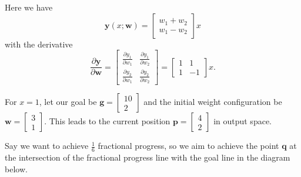 \documentclass{article}
\let\vec\mathbf
\begin{document}
Here we have
\begin{equation*}
    \vec{y}(x; \vec{w}) = 
    \begin{bmatrix}
        w_1 + w_2 \\
        w_1 - w_2
    \end{bmatrix}
    x
\end{equation*}
with the derivative
\begin{equation*}
    \frac{\partial \vec{y}}{\partial \vec{w}}
    =
    \begin{bmatrix}
        \frac{\partial y_1}{\partial w_1} & \frac{\partial y_1}{\partial w_2} \\
        \frac{\partial y_2}{\partial w_1} & \frac{\partial y_2}{\partial w_2}
    \end{bmatrix}
    =
    \begin{bmatrix}
        1 & 1 \\
        1 & -1
    \end{bmatrix}
    x.
\end{equation*}

For
$x = 1$,
let our goal be $\vec{g} = \begin{bmatrix} 10 \\ 2 \end{bmatrix}$
and the initial weight configuration be
$\vec{w} = \begin{bmatrix} 3 \\ 1 \end{bmatrix}$.
This leads to the current position $\vec{p} = \begin{bmatrix} 4 \\ 2 \end{bmatrix}$ in output space.

Say we want to achieve $\frac{1}{6}$ fractional progress, so we aim to achieve the point $\vec{q}$ at the intersection of the fractional progress line with the goal line in the diagram below. 


\end{document}
